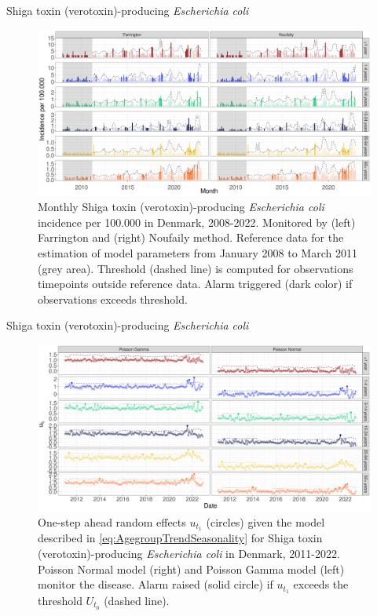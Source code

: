 \documentclass[aspectratio=169]{beamer}
\begin{document}
\begin{frame}{Shiga toxin (verotoxin)-producing \emph{Escherichia coli}}
\tiny

\begin{figure}[H]
\includegraphics[width=0.7\linewidth]{../figures/Compare_stateOfTheArt_STEC} \caption{Monthly Shiga toxin (verotoxin)-producing \textit{Escherichia coli} incidence per 100.000 in Denmark, 2008-2022. Monitored by (left) Farrington and (right) Noufaily method. Reference data for the estimation of model parameters from January 2008 to March 2011 (grey area). Threshold (dashed line) is computed for observations timepoints outside reference data. Alarm triggered (dark color) if observations exceeds threshold. }\label{fig:CompareStateOfTheArtSTEC}
\end{figure}

\normalsize
\end{frame}

\begin{frame}{Shiga toxin (verotoxin)-producing \emph{Escherichia coli}}
\protect\hypertarget{shiga-toxin-verotoxin-producing-escherichia-coli-1}{}
\tiny

\begin{figure}[H]
\includegraphics[width=0.7\linewidth]{../figures/Compare_novel_STEC} \caption{One-step ahead random effects $u_{t_1}$ (circles) given the model described in \eqref{eq:AgegroupTrendSeasonality} for Shiga toxin (verotoxin)-producing \textit{Escherichia coli} in Denmark, 2011-2022. Poisson Normal model (right) and Poisson Gamma model (left) monitor the disease. Alarm raised (solid circle) if $u_{t_1}$ exceeds the threshold $U_{t_0}$ (dashed line).}\label{fig:CompareNovelSTEC}
\end{figure}

\normalsize
\end{frame}
\end{document}
